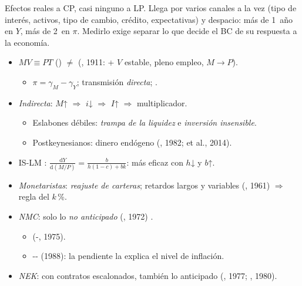 \documentclass{article}
\begin{document}
\begin{columnas}
\begin{ideaclave}
Efectos reales a CP, casi ninguno a LP. Llega por varios canales a la vez (tipo de interés, activos, tipo de cambio, crédito, expectativas) y despacio: más de 1~año en $Y$, más de 2~en $\pi$. Medirlo exige separar lo que decide el BC de su respuesta a la economía.
\end{ideaclave}

\begin{itemize}
\item {} $MV\equiv PT$ () $\neq$  (, 1911: + $V$ estable, pleno empleo, $M\to P$).
  \begin{itemize}
  \item $\pi=\gamma_M-\gamma_Y$; transmisión \emph{directa}; .
  \end{itemize}
\end{itemize}
\begin{itemize}
\item \emph{Indirecta}: $M$↑ $\Rightarrow$ $i$↓ $\Rightarrow$ $I$↑ $\Rightarrow$ multiplicador.
  \begin{itemize}
  \item Eslabones débiles: \emph{trampa de la liquidez} e \emph{inversión insensible}.
  \item Postkeynesianos: dinero endógeno (, 1982;  et al., 2014).
  \end{itemize}
\end{itemize}
\begin{itemize}
\item IS-LM : $\frac{\mathrm dY}{\mathrm d(M/P)}=\frac{b}{h(1-c)+bk}$: más eficaz con $h$↓ y $b$↑.
\item \emph{Monetaristas}: \emph{reajuste de carteras}; retardos largos y variables (, 1961) $\Rightarrow$ regla del $k$\,\%.
\item \emph{NMC}: solo lo \emph{no anticipado} (, 1972) .
  \begin{itemize}
  \item {} (-, 1975).
  \item {}-- (1988): la pendiente la explica el nivel de inflación.
  \end{itemize}
\item \emph{NEK}: con contratos escalonados, también lo anticipado (, 1977; , 1980).
\end{itemize}


\end{columnas}
\end{document}
